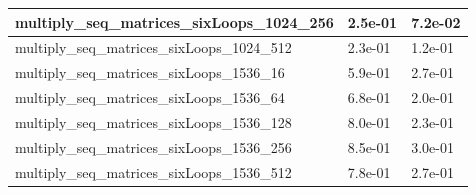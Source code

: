 \documentclass{scrartcl}
\begin{document}
\begin{table}[H]
\begin{tabular}{|l|l|l|}
multiply\_seq\_matrices\_sixLoops\_1024\_256 & 2.5e-01            & 7.2e-02           \\ \hline
multiply\_seq\_matrices\_sixLoops\_1024\_512 & 2.3e-01            & 1.2e-01           \\ \hline
multiply\_seq\_matrices\_sixLoops\_1536\_16  & 5.9e-01            & 2.7e-01           \\ \hline
multiply\_seq\_matrices\_sixLoops\_1536\_64  & 6.8e-01            & 2.0e-01           \\ \hline
multiply\_seq\_matrices\_sixLoops\_1536\_128 & 8.0e-01            & 2.3e-01           \\ \hline
multiply\_seq\_matrices\_sixLoops\_1536\_256 & 8.5e-01            & 3.0e-01           \\ \hline
multiply\_seq\_matrices\_sixLoops\_1536\_512 & 7.8e-01            & 2.7e-01           \\ \hline
\end{tabular}
\end{table}
\end{document}

